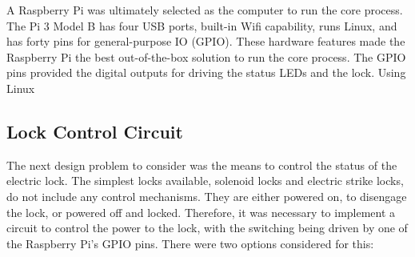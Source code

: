 \documentclass[12pt]{report}
\let\Oldsubsection\subsection
\renewcommand{\subsection}{\FloatBarrier\Oldsubsection}
\begin{document}
A Raspberry Pi was ultimately selected as the computer to run the core process. The Pi 3 Model B has four USB ports, 
built-in Wifi capability, runs Linux, and has forty pins for general-purpose IO (GPIO). These hardware features made the
Raspberry Pi the best out-of-the-box solution to run the core process. The GPIO pins provided the digital outputs for 
driving the status LEDs and the lock. Using Linux 

\subsection{Lock Control Circuit} \label{lock-control-circuit}

The next design problem to consider was the means to control the status of the electric lock. The simplest locks 
available, solenoid locks and electric strike locks, do not include any control mechanisms. They are either powered on, 
to disengage the lock, or powered off and locked. Therefore, it was necessary to implement a circuit to control the
power to the lock, with the switching being driven by one of the Raspberry Pi's GPIO pins. There were two options
considered for this:
\end{document}
